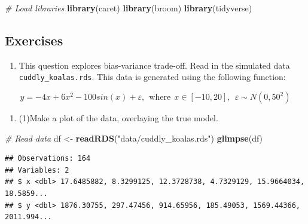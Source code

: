 \documentclass[
]{article}
\newenvironment{Shaded}{\begin{snugshade}}{\end{snugshade}}
\newcommand{\CommentTok}[1]{\textcolor[rgb]{0.56,0.35,0.01}{\textit{#1}}}
\newcommand{\KeywordTok}[1]{\textcolor[rgb]{0.13,0.29,0.53}{\textbf{#1}}}
\newcommand{\NormalTok}[1]{#1}
\newcommand{\StringTok}[1]{\textcolor[rgb]{0.31,0.60,0.02}{#1}}
\providecommand{\tightlist}{%
  \setlength{\itemsep}{0pt}\setlength{\parskip}{0pt}}
\begin{document}
\begin{Shaded}
\begin{Highlighting}[]
\CommentTok{# Load libraries}
\KeywordTok{library}\NormalTok{(caret)}
\KeywordTok{library}\NormalTok{(broom)}
\KeywordTok{library}\NormalTok{(tidyverse)}
\end{Highlighting}
\end{Shaded}

\hypertarget{exercises}{%
\subsection{Exercises}\label{exercises}}

\begin{enumerate}
\def\labelenumi{\arabic{enumi}.}
\tightlist
\item
  This question explores bias-variance trade-off. Read in the simulated
  data \texttt{cuddly\_koalas.rds}. This data is generated using the
  following function:
\end{enumerate}

\[ y = -4x + 6x^2 - 100sin(x) + \varepsilon, ~~\text{where}~~x\in [-10, 20], ~~\varepsilon\sim N(0, 50^2)\]

\begin{enumerate}
\def\labelenumi{\alph{enumi}.}
\tightlist
\item
  (1)Make a plot of the data, overlaying the true model.
\end{enumerate}

\begin{Shaded}
\begin{Highlighting}[]
\CommentTok{# Read data}
\NormalTok{df <-}\StringTok{ }\KeywordTok{readRDS}\NormalTok{(}\StringTok{"data/cuddly_koalas.rds"}\NormalTok{)}
\KeywordTok{glimpse}\NormalTok{(df)}
\end{Highlighting}
\end{Shaded}

\begin{verbatim}
## Observations: 164
## Variables: 2
## $ x <dbl> 17.6485882, 8.3299125, 12.3728738, 4.7329129, 15.9664034, 18.5859...
## $ y <dbl> 1876.30755, 297.47456, 914.65956, 185.49053, 1569.44366, 2011.994...
\end{verbatim}
\end{document}
